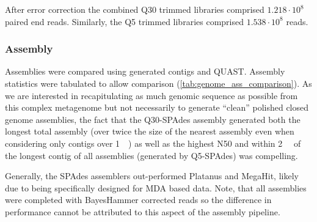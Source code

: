 After error correction the combined Q30 trimmed libraries comprised
\(1.218\cdot10^{8}\) paired end reads.  Similarly, the Q5 trimmed
libraries comprised \(1.538\cdot10^{8}\) reads. 

\subsubsection{Assembly}

Assemblies were compared using generated contigs and QUAST.
Assembly statistics were tabulated to allow comparison (\cref{tab:genome_ass_comparison}).
As we are interested in recapitulating as much genomic sequence as possible
from this complex metagenome but not necessarily to generate ``clean''
polished closed genome assemblies, the fact that the Q30-SPAdes assembly
generated both the longest total assembly (over twice the size of the nearest
assembly even when considering only contigs over \SI{1}{\kilo\bp}) as well
as the highest N50 and within \SI{2}{\kilo\bp} of the longest contig of all assemblies (generated
by Q5-SPAdes) was compelling. 

Generally, the SPAdes assemblers out-performed Platanus and MegaHit, likely due to 
being specifically designed for MDA based data.  Note, that all assemblies 
were completed with BayesHammer corrected reads so the difference in performance
cannot be attributed to this aspect of the assembly pipeline.

